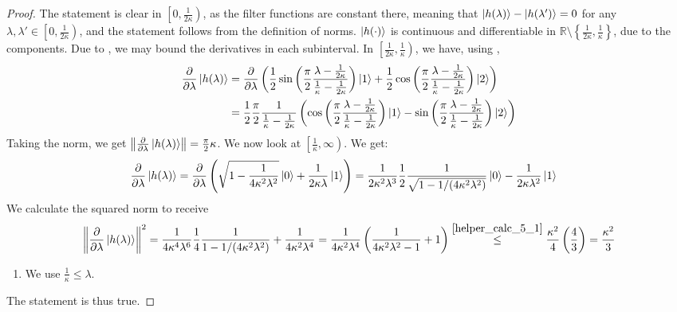 \begin{proof}
    The statement is clear in \(\left[0, \frac{1}{2\kappa}\right)\), as the filter functions are constant there, meaning that \(\ket{h(\lambda)}-\ket{h(\lambda')} = 0\) for any \(\lambda, \lambda' \in \left[0, \frac{1}{2\kappa}\right)\), and the statement follows from the definition of norms. \(\ket{h(\cdot)}\) is continuous and differentiable in \(\mathbb{R} \setminus \left\{\frac{1}{2\kappa}, \frac{1}{\kappa}\right\}\), due to the components. Due to , we may bound the derivatives in each subinterval. In \(\left[\frac{1}{2\kappa}, \frac{1}{\kappa}\right)\), we have, using ,
    \begin{align}
        \frac{\partial}{\partial \lambda} \ket{h(\lambda)} &= \frac{\partial}{\partial \lambda} \left(\frac{1}{2} \sin\left(\frac{\pi}{2}\frac{\lambda-\frac{1}{2\kappa}}{\frac{1}{\kappa}-\frac{1}{2\kappa}}\right)\ket{1}+\frac{1}{2} \cos\left(\frac{\pi}{2}\frac{\lambda-\frac{1}{2\kappa}}{\frac{1}{\kappa}-\frac{1}{2\kappa}}\right)\ket{2}\right)\\
        &= \frac{1}{2} \frac{\pi}{2} \frac{1}{\frac{1}{\kappa}-\frac{1}{2\kappa}} \left(\cos\left(\frac{\pi}{2}\frac{\lambda-\frac{1}{2\kappa}}{\frac{1}{\kappa}-\frac{1}{2\kappa}}\right)\ket{1}-\sin\left(\frac{\pi}{2}\frac{\lambda-\frac{1}{2\kappa}}{\frac{1}{\kappa}-\frac{1}{2\kappa}}\right)\ket{2}\right)
    \end{align}
    Taking the norm, we get \(\norm{\frac{\partial}{\partial\lambda}\ket{h(\lambda)}} = \frac{\pi}{2}\kappa\). We now look at \(\left[\frac{1}{\kappa}, \infty\right)\). We get:
    \begin{align}
        \frac{\partial}{\partial \lambda} \ket{h(\lambda)} &= \frac{\partial}{\partial\lambda} \left(\sqrt{1-\frac{1}{4\kappa^2\lambda^2}}\ket{0}+\frac{1}{2\kappa\lambda}\ket{1}\right) = \frac{1}{2\kappa^2\lambda^3} \frac{1}{2} \frac{1}{\sqrt{1-1/(4\kappa^2\lambda^2)}}\ket{0}-\frac{1}{2\kappa\lambda^2}\ket{1}
    \end{align}
    We calculate the squared norm to receive
    \begin{align}
        \norm{\frac{\partial}{\partial\lambda}\ket{h(\lambda)}}^2 = \frac{1}{4\kappa^4\lambda^6}\frac{1}{4}\frac{1}{1-1/(4\kappa^2\lambda^2)}+\frac{1}{4\kappa^2\lambda^4} = \frac{1}{4\kappa^2\lambda^4}\left(\frac{1}{4\kappa^2\lambda^2-1}+1\right) \overset{\ref{helper_calc_5_1}}{\leq} \frac{\kappa^2}{4} \left(\frac{4}{3}\right) = \frac{\kappa^2}{3}
    \end{align}
    \begin{enumerate}[label=(\arabic*)]
        \item \label{helper_calc_5_1} We use \(\frac{1}{\kappa} \leq \lambda\).
    \end{enumerate}

    The statement is thus true.
\end{proof}


